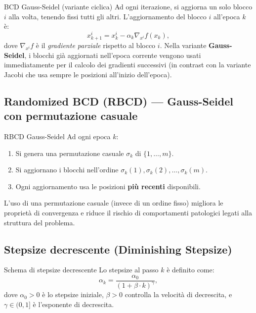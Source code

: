 \documentclass[12pt,a4paper]{article}
\theoremstyle{definition}
\newcommand{\grad}{\nabla}
\begin{document}
\begin{definbox}{BCD Gauss-Seidel (variante ciclica)}
Ad ogni iterazione, si aggiorna un solo blocco $i$ alla volta, tenendo fissi tutti gli altri.
L'aggiornamento del blocco $i$ all'epoca $k$ è:
\[
  x^i_{k+1} = x^i_k - \alpha_k \grad_{x^i} f(x_k),
\]
dove $\grad_{x^i} f$ è il \emph{gradiente parziale} rispetto al blocco $i$.
Nella variante \textbf{Gauss-Seidel}, i blocchi già aggiornati nell'epoca corrente vengono
usati immediatamente per il calcolo dei gradienti successivi (in contrast con la variante
Jacobi che usa sempre le posizioni all'inizio dell'epoca).
\end{definbox}

\subsection{Randomized BCD (RBCD) — Gauss-Seidel con permutazione casuale}

\begin{definbox}{RBCD Gauss-Seidel}
Ad ogni epoca $k$:
\begin{enumerate}
  \item Si genera una permutazione casuale $\sigma_k$ di $\{1, \ldots, m\}$.
  \item Si aggiornano i blocchi nell'ordine $\sigma_k(1), \sigma_k(2), \ldots, \sigma_k(m)$.
  \item Ogni aggiornamento usa le posizioni \textbf{più recenti} disponibili.
\end{enumerate}
L'uso di una permutazione casuale (invece di un ordine fisso) migliora le proprietà di
convergenza e riduce il rischio di comportamenti patologici legati alla struttura del problema.
\end{definbox}

\subsection{Stepsize decrescente (Diminishing Stepsize)}

\begin{definbox}{Schema di stepsize decrescente}
Lo stepsize al passo $k$ è definito come:
\[
  \alpha_k = \frac{\alpha_0}{(1 + \beta \cdot k)^\gamma},
\]
dove $\alpha_0 > 0$ è lo stepsize iniziale, $\beta > 0$ controlla la velocità di decrescita,
e $\gamma \in (0,1]$ è l'esponente di decrescita.
\end{definbox}
\end{document}
